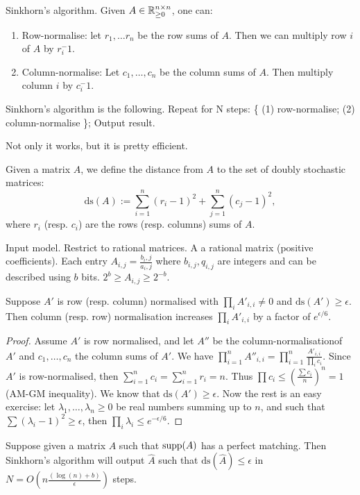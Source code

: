  Sinkhorn's algorithm.
 Given $A\in \mathbb{R}_{\geq 0}^{n\times n}$, one can:
 \begin{enumerate} 
 \item Row-normalise: let $r_1,\dots r_n$ be the row sums of $A$. Then we can multiply row $i$ of $A$ by $r_i^-1$. 
 \item Column-normalise: Let $c_1,\dots,c_n$ be the column sums of $A$. Then multiply column $i$ by $c_i^-1$.
 \end{enumerate}
 Sinkhorn's algorithm is the following. Repeat for N steps: \{ (1) row-normalise; (2) column-normalise \}; Output result.
	
Not only it works, but it is pretty efficient. 
 
\begin{definition}
Given a matrix $A$, we define the distance from $A$ to the set of doubly stochastic matrices:
\[
\mathrm{ds}(A) := \sum_{i=1}^n (r_i-1)^2 + \sum_{j=1}^n (c_j-1)^2,
\]
where $r_i$ (resp. $c_i$) are the rows (resp. columns) sums of $A$.
\end{definition}

Input model. Restrict to rational matrices. A a rational matrix (positive coefficients). Each entry $A_{i,j} = \frac{b_i,j}{a_i,j}$ where $b_{i,j},q_{i,j}$ are integers and can be described using $b$ bits. $2^b\geq A_{i,j} \geq 2^{-b}$.

\begin{lemma} 
Suppose $A'$ is row (resp. column) normalised with $\prod_i A'_{i,i} \neq 0$ and $\mathrm{ds}(A')\geq \epsilon$. Then column (resp. row) normalisation increases $\prod_i A'_{i,i}$ by a factor of $e^{\epsilon / 6}$.
\end{lemma}

\begin{proof} 
Assume $A'$ is row normalised, and let $A''$ be the column-normalisationof $A'$ and $c_1, \dots, c_n$ the column sums of $A'$. We have $\prod_{i=1}^n A''_{i,i} = \prod_{i=1}^n \frac{A'_{i,i}}{\prod_i c_i}$. Since $A'$ is row-normalised, then $\sum_{i=1}^n c_i=\sum_{i=1}^n r_i = n$. Thus $\prod c_i \leq (\frac{\sum c_i}{n})^n =1$ (AM-GM inequality). We know that $\mathrm{ds}(A') \geq \epsilon$. Now the rest is an easy exercise: let $\lambda_1,\dots,\lambda_n \geq 0$ be real numbers summing up to $n$, and such that $\sum (\lambda_i-1)^2 \geq \epsilon$, then $\prod_i \lambda_i \leq e^{-\epsilon/6}$.
\end{proof}

\begin{theorem}
Suppose given a matrix $A$ such that $\mathrm{supp}(A)$ has a perfect matching. Then Sinkhorn's algorithm will output $\hat{A}$ such that $\mathrm{ds}(\hat{A})\leq \epsilon$ in $N=O(n \frac{(\log(n)+b)}{\epsilon})$ steps.
\end{theorem}

